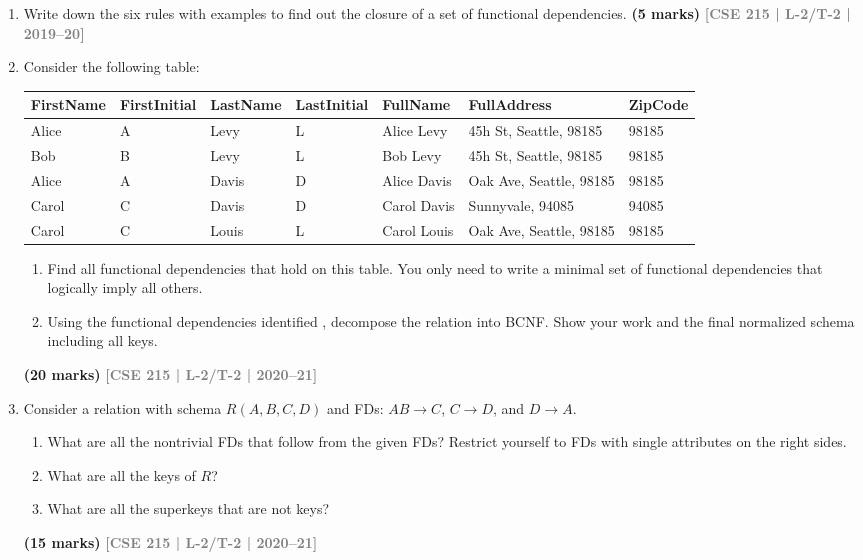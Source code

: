 \documentclass[12pt,a3paper]{article}
\newcommand{\yr}[1]{\hfill\textcolor{gray}{\small\textbf{[#1]}}}
\newcommand{\mk}[1]{\textcolor{orange!70!black}{\small\textbf{(#1 marks)}}}
\begin{document}
\begin{enumerate}
\item Write down the six rules with examples to find out the closure of a set of functional dependencies.
\mk{5} \yr{CSE 215 | L-2/T-2 | 2019--20}

\item Consider the following table:

\medskip
\begin{center}
\small
\begin{tabular}{lllllll}
\toprule
\textbf{FirstName} & \textbf{FirstInitial} & \textbf{LastName} & \textbf{LastInitial} & \textbf{FullName} & \textbf{FullAddress} & \textbf{ZipCode}\\
\midrule
Alice & A & Levy  & L & Alice Levy  & 45h St, Seattle, 98185 & 98185\\
Bob   & B & Levy  & L & Bob Levy    & 45h St, Seattle, 98185 & 98185\\
Alice & A & Davis & D & Alice Davis & Oak Ave, Seattle, 98185 & 98185\\
Carol & C & Davis & D & Carol Davis & Sunnyvale, 94085 & 94085\\
Carol & C & Louis & L & Carol Louis & Oak Ave, Seattle, 98185 & 98185\\
\bottomrule
\end{tabular}
\end{center}
\begin{enumerate}
\item Find all functional dependencies that hold on this table. You only need to write a minimal set of functional dependencies that logically imply all others.

\item Using the functional dependencies identified , decompose the relation into BCNF. Show your work and the final normalized schema including all keys.
\end{enumerate}
\mk{20} \yr{CSE 215 | L-2/T-2 | 2020--21}


\item Consider a relation with schema $R(A, B, C, D)$ and FDs: $AB \to C$, $C \to D$, and $D \to A$.
\begin{enumerate}
  \item What are all the nontrivial FDs that follow from the given FDs? Restrict yourself to FDs with single attributes on the right sides.
  \item What are all the keys of $R$?
  \item What are all the superkeys that are not keys?
\end{enumerate}
 \mk{15} \yr{CSE 215 | L-2/T-2 | 2020--21}


\end{enumerate}
\end{document}
